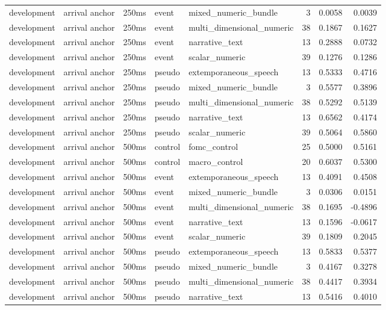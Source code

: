 \begin{tabular}{lllllrrr}
development & arrival anchor & 250ms & event & mixed_numeric_bundle & 3 & 0.0058 & 0.0039 \\
development & arrival anchor & 250ms & event & multi_dimensional_numeric & 38 & 0.1867 & 0.1627 \\
development & arrival anchor & 250ms & event & narrative_text & 13 & 0.2888 & 0.0732 \\
development & arrival anchor & 250ms & event & scalar_numeric & 39 & 0.1276 & 0.1286 \\
development & arrival anchor & 250ms & pseudo & extemporaneous_speech & 13 & 0.5333 & 0.4716 \\
development & arrival anchor & 250ms & pseudo & mixed_numeric_bundle & 3 & 0.5577 & 0.3896 \\
development & arrival anchor & 250ms & pseudo & multi_dimensional_numeric & 38 & 0.5292 & 0.5139 \\
development & arrival anchor & 250ms & pseudo & narrative_text & 13 & 0.6562 & 0.4174 \\
development & arrival anchor & 250ms & pseudo & scalar_numeric & 39 & 0.5064 & 0.5860 \\
development & arrival anchor & 500ms & control & fomc_control & 25 & 0.5000 & 0.5161 \\
development & arrival anchor & 500ms & control & macro_control & 20 & 0.6037 & 0.5300 \\
development & arrival anchor & 500ms & event & extemporaneous_speech & 13 & 0.4091 & 0.4508 \\
development & arrival anchor & 500ms & event & mixed_numeric_bundle & 3 & 0.0306 & 0.0151 \\
development & arrival anchor & 500ms & event & multi_dimensional_numeric & 38 & 0.1695 & -0.4896 \\
development & arrival anchor & 500ms & event & narrative_text & 13 & 0.1596 & -0.0617 \\
development & arrival anchor & 500ms & event & scalar_numeric & 39 & 0.1809 & 0.2045 \\
development & arrival anchor & 500ms & pseudo & extemporaneous_speech & 13 & 0.5833 & 0.5377 \\
development & arrival anchor & 500ms & pseudo & mixed_numeric_bundle & 3 & 0.4167 & 0.3278 \\
development & arrival anchor & 500ms & pseudo & multi_dimensional_numeric & 38 & 0.4417 & 0.3934 \\
development & arrival anchor & 500ms & pseudo & narrative_text & 13 & 0.5416 & 0.4010 \\

\end{tabular}
